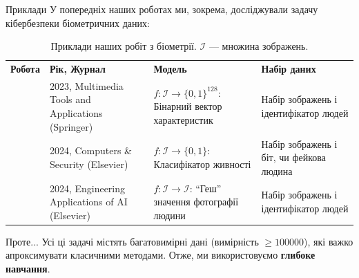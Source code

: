\documentclass{zkdl-presentation-template}
\begin{document}
    \begin{frame}{Приклади}
        У попередніх наших роботах
        \cite{our-biometrics-1,our-biometrics-2,our-biometrics-3} ми, зокрема,
        досліджували задачу кібербезпеки біометричних даних:

        \begin{table}
            \scriptsize
            \centering
            \begin{tabularx}{\textwidth}{|c|X|X|X|}
                \hline
                \cellcolor{gray!20}\textbf{Робота} & \cellcolor{gray!20}\textbf{Рік, Журнал} & \cellcolor{gray!20}\textbf{Модель} & \cellcolor{gray!20}\textbf{Набір даних} \\
                \cite{our-biometrics-1} & 2023, Multimedia Tools and Applications (Springer) & $f: \mathcal{I} \to \{0,1\}^{128}$: Бінарний вектор характеристик & Набір зображень і ідентифікатор людей \\
                \cite{our-biometrics-2} & 2024, Computers \& Security (Elsevier) & $f: \mathcal{I} \to \{0,1\}$: Класифікатор живності & Набір зображень і біт, чи фейкова людина \\
                \cite{our-biometrics-3} & 2024, Engineering Applications of AI (Elsevier) & $f: \mathcal{I} \to \mathcal{I}$: ``Геш'' значення фотографії людини & Набір зображень і ідентифікатор людей \\
                \hline
            \end{tabularx}
            \caption{Приклади наших робіт з біометрії. $\mathcal{I}$ --- множина зображень.}
        \end{table}

        \pause\begin{alertblock}{Проте...}
            Усі ці задачі містять багатовимірні дані (вимірність $\geq 100000$), які важко апроксимувати
            класичними методами. Отже, ми використовуємо \textbf{глибоке навчання}.
        \end{alertblock}
    \end{frame}
\end{document}
